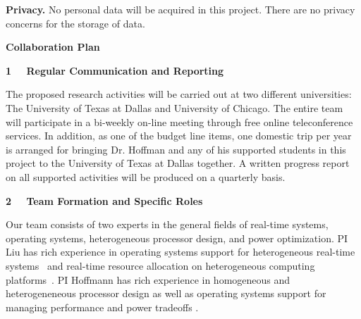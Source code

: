 \documentclass[10pt,letterpaper]{article}
\begin{document}
\vspace{1mm}
\noindent \textbf{Privacy.} No personal data will be acquired in this project. There are no privacy concerns for the storage of data.


\newpage
\begin{center}
\Large\textbf{Collaboration Plan}
\end{center} \normalsize

\vspace{6mm}
\large \noindent\textbf{1 \ \ Regular Communication and Reporting}\normalsize
\vspace{4mm}

\noindent The proposed research activities will be carried out at two different universities: The University of Texas at Dallas and University of Chicago. The entire team will participate in a bi-weekly on-line meeting through free online teleconference services. In addition, as one of the budget line items, one domestic trip per year is arranged for bringing Dr. Hoffman and any of his supported students in this project to the University of Texas at Dallas together. A written progress report on all supported activities will be produced on a quarterly basis.

\vspace{6mm}
\large \noindent\textbf{2 \ \ Team Formation and Specific Roles}\normalsize
\vspace{4mm}

\noindent Our team consists of two experts in the general fields of real-time systems, operating systems, heterogeneous processor design, and power optimization. PI Liu has rich experience in operating systems support for heterogeneous real-time systems~\cite{Liu12, GPES, zhou2015supporting, Zhou2014a} and real-time resource allocation on heterogeneous computing platforms~\cite{chen2015k2u, Tong14a, LiuRTSS14a, Liu1, Liu2, Liu6, Liu7, Liu10, liu2014supporting, LiuRTSS14b, elliott1minimizing, Liu3, Liu4, Liu5, Liu9, Liu11, Liu13}.
PI Hoffmann has rich experience in homogeneous\cite{raw1,raw2,raw3,tilera1,tilera2} and heterogeneneous \cite{ASAP,HPEC,ASAP2,ISSoC} processor design as well as operating systems support for managing performance and power tradeoffs \cite{LEO,POET,DynamicKnobs,JouleGuard,PTRADE,PCP,TCST,HotPower,kim-cpsna}.
\end{document}
